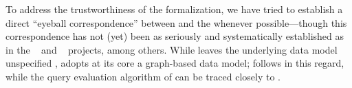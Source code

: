 


To address the trustworthiness of the \gcoql formalization, we have tried to establish a direct ``eyeball correspondence'' between \gcoql and the \spec whenever possible---though this correspondence has not (yet) been as seriously and systematically established as in the \jscert~\cite{jscert} and \coqr~\cite{coqr} projects, among others.
While \spec leaves the underlying data model unspecified , 
\HP adopts at its core a graph-based data model; \gcoql follows \HP in this regard, while the query evaluation algorithm of \gcoql can be traced closely to \spec.

